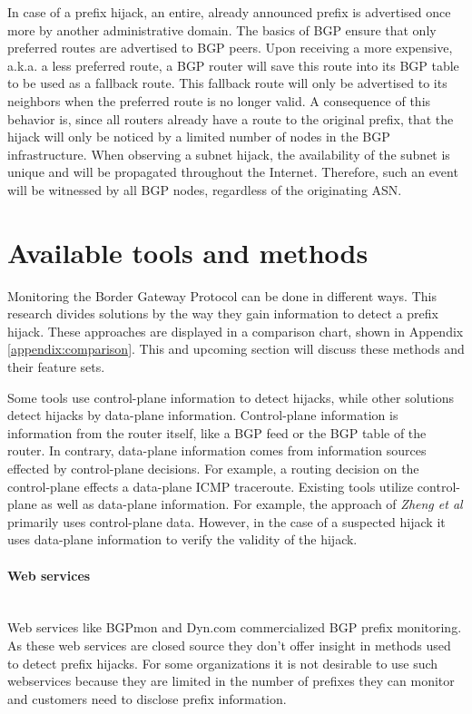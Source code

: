 In case of a prefix hijack, an entire, already announced prefix is advertised once more by another administrative domain. The basics of BGP ensure that only preferred routes are advertised to BGP peers. Upon receiving a more expensive, a.k.a. a less preferred route, a BGP router will save this route into its BGP table to be used as a fallback route. This fallback route will only be advertised to its neighbors when the preferred route is no longer valid. A consequence of this behavior is, since all routers already have a route to the original prefix, that the hijack will only be noticed by a limited number of nodes in the BGP infrastructure. When observing a subnet hijack, the availability of the subnet is unique and will be propagated throughout the Internet. Therefore, such an event will be witnessed by all BGP nodes, regardless of the originating ASN.\par

\section{Available tools and methods}\label{sec:availabletools}
Monitoring the Border Gateway Protocol can be done in different ways. This research divides solutions by the way they gain information to detect a prefix hijack. These approaches are displayed in a comparison chart, shown in Appendix \ref{appendix:comparison}. This and upcoming section will discuss these methods and their feature sets.\\\par

Some tools use control-plane information to detect hijacks, while other solutions detect hijacks by data-plane information. Control-plane information is information from the router itself, like a BGP feed or the BGP table of the router. In contrary, data-plane information comes from information sources effected by control-plane decisions. For example, a routing decision on the control-plane effects a data-plane ICMP traceroute. Existing tools utilize control-plane as well as data-plane information. For example, the approach of \emph{Zheng et al}\cite{zheng2007light} primarily uses control-plane data. However, in the case of a suspected hijack it uses data-plane information to verify the validity of the hijack.

\paragraph{Web services}\label{par:webserices}\mbox{ }\\
Web services like BGPmon \cite{bgpmon} and Dyn.com \cite{dyn} commercialized BGP prefix monitoring. As these web services are closed source they don't offer insight in methods used to detect prefix hijacks. For some organizations it is not desirable to use such webservices because they are limited in the number of prefixes they can monitor and customers need to disclose prefix information.\par

